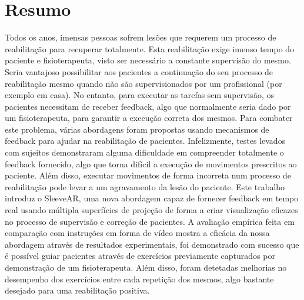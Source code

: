 \cleardoublepage


\chapter*{Resumo}
\thispagestyle{empty}

 
Todos os anos, imensas pessoas sofrem les\~oes que requerem um processo de reabilita\c{c}\~ao para recuperar totalmente.  
Esta reabilita\c{c}\~ao exige imenso tempo do paciente e fisioterapeuta, visto ser necess\'ario a constante supervis\~ao do mesmo. 
Seria vantajoso possibilitar aos pacientes a continua\c{c}\~ao do seu processo de reabilita\c{c}\~ao mesmo quando n\~ao s\~ao supervisionados por um profissional (por exemplo em casa). 
No entanto, para executar as tarefas sem supervis\~ao, os pacientes necessitam de receber feedback, algo que normalmente seria dado por um fisioterapeuta, para garantir a execu\c{c}\~ao correta dos mesmos.
Para combater este problema, v\'arias abordagens foram propostas usando mecanismos de feedback para ajudar na reabilita\c{c}\~ao de pacientes. Infelizmente, testes levados com sujeitos demonstraram alguma dificuldade em compreender totalmente o feedback fornecido, algo que torna dif\'icil a execu\c{c}\~ao de movimentos prescritos ao paciente. Al\'em disso, executar movimentos de forma incorreta num processo de reabilita\c{c}\~ao pode levar a um agravamento da les\~ao do paciente. Este trabalho introduz o SleeveAR,  uma nova abordagem capaz de fornecer feedback em tempo real usando m\'ultipla superf\'icies de proje\c{c}\~ao de forma a criar visualiza\c{c}\~ao eficazes no processo de supervis\~ao e corre\c{c}\~ao de pacientes.
A avalia\c{c}\~ao emp\'irica feita em compara\c{c}\~ao com instru\c{c}\~oes em forma de v\'ideo mostra a efic\'acia da nossa abordagem atrav\'es de resultados experimentais, foi demonstrado com sucesso que \'e poss\'ivel guiar pacientes atrav\'es de exerc\'icios previamente capturados por demonstra\c{c}\~ao de um fisioterapeuta. Al\'em disso, foram detetadas melhorias no desempenho dos exerc\'icios entre cada repeti\c{c}\~ao dos mesmos, algo bastante desejado para uma reabilita\c{c}\~ao positiva.


\newpage


